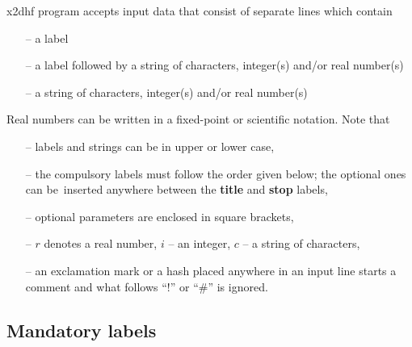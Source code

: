 \documentclass[12pt,a4paper]{article}
\begin{document}
x2dhf program accepts input data that consist of separate lines which contain
\begin{itemize}
\item[--] a label
\item[--] a label followed by a string of characters, integer(s)
  and/or real number(s)
\item[--] a string of characters, integer(s) and/or real number(s)
\end{itemize}
Real numbers can be written in a fixed-point or scientific notation.
\noindent
Note that
\begin{itemize}
\item[--] labels and strings can be in upper or lower case,


\item[--] the compulsory labels must follow the order given below; the
  optional ones can be~inserted anywhere between the \textbf{title}
  and \textbf{stop} labels,

\item[--] optional parameters are enclosed in square brackets,

\item[--] $r$ denotes a real number, $i$ -- an integer, $c$ -- a string
          of characters,

\item[--] an exclamation mark or a hash placed anywhere in an input
  line starts a comment and what follows ``!'' or ``\#'' is ignored.

\end{itemize}

\noindent
\subsection{Mandatory labels}
\end{document}
